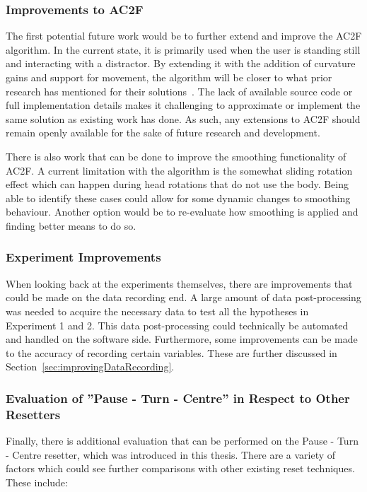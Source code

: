 \subsubsection{Improvements to AC2F}
The first potential future work would be to further extend and improve the AC2F algorithm. In the current state, it is primarily used when the user is standing still and interacting with a distractor. By extending it with the addition of curvature gains and support for movement, the algorithm will be closer to what prior research has mentioned for their solutions~\cite{peck2010improved, chen2017towards, chen2017supporting}. The lack of available source code or full implementation details makes it challenging to approximate or implement the same solution as existing work has done. As such, any extensions to AC2F should remain openly available for the sake of future research and development. 

There is also work that can be done to improve the smoothing functionality of AC2F. A current limitation with the algorithm is the somewhat sliding rotation effect which can happen during head rotations that do not use the body. Being able to identify these cases could allow for some dynamic changes to smoothing behaviour. Another option would be to re-evaluate how smoothing is applied and finding better means to do so. 

\subsubsection{Experiment Improvements}
When looking back at the experiments themselves, there are improvements that could be made on the data recording end. A large amount of data post-processing was needed to acquire the necessary data to test all the hypotheses in Experiment 1 and 2. This data post-processing could technically be automated and handled on the software side. Furthermore, some improvements can be made to the accuracy of recording certain variables. These are further discussed in Section~\ref{sec:improvingDataRecording}. 

\subsubsection{Evaluation of ''Pause - Turn - Centre'' in Respect to Other Resetters}
Finally, there is additional evaluation that can be performed on the Pause - Turn - Centre resetter, which was introduced in this thesis. There are a variety of factors which could see further comparisons with other existing reset techniques. These include:


